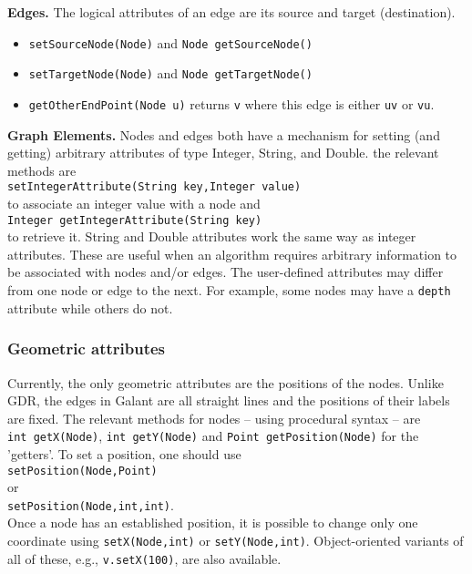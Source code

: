 \bigskip
\textbf{Edges.}
The logical attributes of an edge are its source and target (destination).

\begin{itemize}
\item
\texttt{setSourceNode(Node)} and \texttt{Node~getSourceNode()}
\item
\texttt{setTargetNode(Node)} and \texttt{Node~getTargetNode()}
\item
\texttt{getOtherEndPoint(Node~u)} returns \texttt{v} where this edge is
either \texttt{uv} or \texttt{vu}.
\end{itemize}

\bigskip
\textbf{Graph Elements.}
Nodes and edges both have a mechanism for setting (and getting)
arbitrary attributes of type Integer, String, and Double.
the relevant methods are\\
\texttt{setIntegerAttribute(String~key,Integer~value)}\\ 
to associate an integer value with a node and\\
\texttt{Integer~getIntegerAttribute(String~key)}\\
to retrieve it.
String and Double attributes work the same way as integer attributes.
These are useful when an algorithm requires arbitrary information to be
associated with nodes and/or edges.
The user-defined attributes may differ from one node or edge to the next.
For example, some nodes may have a \texttt{depth} attribute while others do not.

\subsubsection{Geometric attributes}

Currently, the only geometric attributes are the positions of the
nodes. 
Unlike GDR, the edges in Galant
are all straight lines and the positions of their labels are fixed.
The relevant methods for nodes -- using procedural syntax -- are
\texttt{int~getX(Node)}, \texttt{int~getY(Node)}
and \texttt{Point~getPosition(Node)}
for the 'getters'. To set a position,
one should use\\
\hspace*{2em}\texttt{setPosition(Node,Point)}\\
or\\
\hspace*{2em}\texttt{setPosition(Node,int,int)}.\\
Once a node has an established position, it is possible to change
only one coordinate using \texttt{setX(Node,int)} or \texttt{setY(Node,int)}.
Object-oriented variants of all of these, e.g.,
\texttt{v.setX(100)}, are also available.

